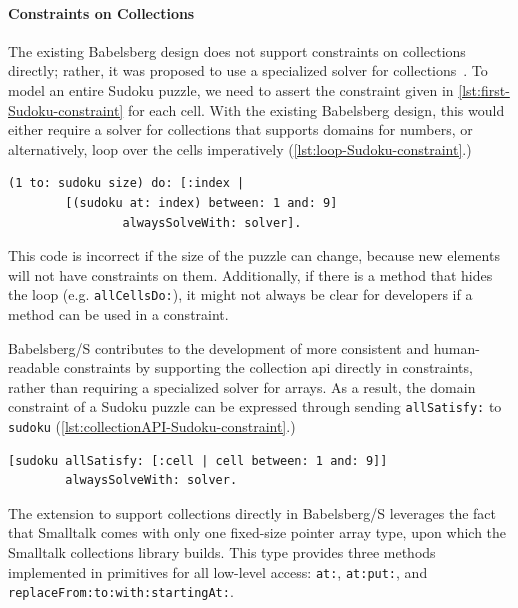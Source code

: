 \paragraph{Constraints on Collections}

The existing Babelsberg design does not support constraints on
collections directly; rather, it was proposed to use a specialized
solver for collections~\cite{felgentreff2014jot}. To model an entire
Sudoku puzzle, we need to assert the constraint given in
\autoref{lst:first-Sudoku-constraint} for each cell. With the existing
Babelsberg design, this would either require a solver for collections
that supports domains for numbers, or alternatively, loop over the
cells imperatively (\autoref{lst:loop-Sudoku-constraint}.)

\begin{lstlisting}[caption=Defining the domain of all Sudoku cells with a loop, label=lst:loop-Sudoku-constraint]
(1 to: sudoku size) do: [:index | 
		[(sudoku at: index) between: 1 and: 9] 
				alwaysSolveWith: solver].
\end{lstlisting}

This code is incorrect if the size of the puzzle can change, because
new elements will not have constraints on them. Additionally, if there
is a method that hides the loop (e.g. \lstinline!allCellsDo:!), it
might not always be clear for developers if a method can be used in a constraint.

Babelsberg/S contributes to the development of more consistent and
human-readable constraints by supporting the collection \ac{api}
directly in constraints, rather than requiring a specialized solver for
arrays. As a result, the domain constraint of a Sudoku puzzle can be
expressed through sending \texttt{allSatisfy:} to \mbox{\texttt{sudoku}}
(\autoref{lst:collectionAPI-Sudoku-constraint}.)

\begin{lstlisting}[caption=Defining the domain of all Sudoku cells with the Collection \ac{api}, label=lst:collectionAPI-Sudoku-constraint]
[sudoku allSatisfy: [:cell | cell between: 1 and: 9]] 
		alwaysSolveWith: solver.
\end{lstlisting}

The extension to support collections directly in Babelsberg/S
leverages the fact that Smalltalk comes with only one fixed-size
pointer array type, upon which the Smalltalk collections library
builds. This type provides three methods implemented in primitives for
all low-level access: \lstinline!at:!, \lstinline!at:put:!, and
\lstinline!replaceFrom:to:with:startingAt:!.

